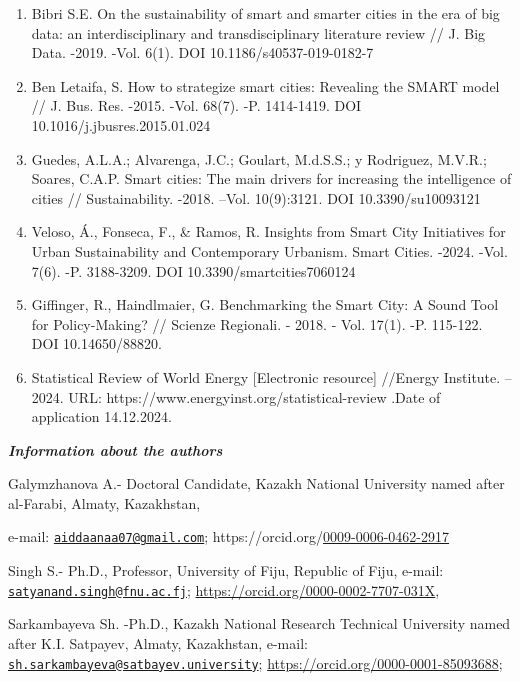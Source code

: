 \begin{enumerate}
\def\labelenumi{\arabic{enumi}.}
\setcounter{enumi}{22}
\item
  Bibri S.E. On the sustainability of smart and smarter cities in the
  era of big data: an interdisciplinary and transdisciplinary literature
  review // J. Big Data. -2019. -Vol. 6(1). DOI
  10.1186/s40537-019-0182-7
\item
  Ben Letaifa, S. How to strategize smart cities: Revealing the SMART
  model // J. Bus. Res. -2015. -Vol. 68(7). -P. 1414-1419. DOI
  10.1016/j.jbusres.2015.01.024
\item
  Guedes, A.L.A.; Alvarenga, J.C.; Goulart, M.d.S.S.; y Rodriguez,
  M.V.R.; Soares, C.A.P. Smart cities: The main drivers for increasing
  the intelligence of cities // Sustainability. -2018. --Vol.
  10(9):3121. DOI 10.3390/su10093121
\item
  Veloso, Á., Fonseca, F., \& Ramos, R. Insights from Smart City
  Initiatives for Urban Sustainability and Contemporary Urbanism. Smart
  Cities. -2024. -Vol. 7(6). -P. 3188-3209. DOI
  10.3390/smartcities7060124
\item
  Giffinger, R., Haindlmaier, G. Benchmarking the Smart City: A Sound
  Tool for Policy-Making? // Scienze Regionali. - 2018. - Vol. 17(1).
  -P. 115-122. DOI 10.14650/88820.
\item
  Statistical Review of World Energy {[}Electronic resource{]} //Energy
  Institute. -- 2024. URL: https://www.energyinst.org/statistical-review
  .Date of application 14.12.2024.
\end{enumerate}

\emph{{\bfseries Information about the authors}}

Galymzhanova A.- Doctoral Candidate, Kazakh National University named
after al-Farabi, Almaty, Kazakhstan,

e-mail:
\href{mailto:aiddaanaa07@gmail.com}{\nolinkurl{aiddaanaa07@gmail.com}};
https://orcid.org/\href{https://orcid.org/0009-0006-0462-2917}{0009-0006-0462-2917}

Singh S.- Ph.D., Professor, University of Fiju, Republic of Fiju,
e-mail:
\href{mailto:satyanand.singh@fnu.ac.fj}{\nolinkurl{satyanand.singh@fnu.ac.fj}};
\url{https://orcid.org/0000-0002-7707-031X},

Sarkambayeva Sh. -Ph.D., Kazakh National Research Technical University
named after K.I. Satpayev, Almaty, Kazakhstan, e-mail:
\href{mailto:sh.sarkambayeva@satbayev.university}{\nolinkurl{sh.sarkambayeva@satbayev.university}};
\url{https://orcid.org/0000-0001-85093688};

